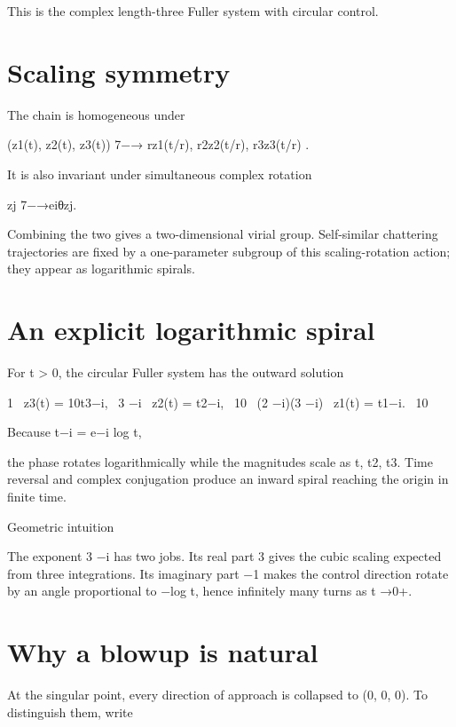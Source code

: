 This is the complex length-three Fuller system with circular control.


\section{Scaling symmetry}

The chain is homogeneous under


(z1(t), z2(t), z3(t)) 7−→ rz1(t/r), r2z2(t/r), r3z3(t/r) .


It is also invariant under simultaneous complex rotation


zj 7−→eiθzj.


Combining the two gives a two-dimensional virial group. Self-similar chattering trajectories are fixed by a one-parameter subgroup of this scaling-rotation action; they appear as logarithmic spirals.


\section{An explicit logarithmic spiral}

For t > 0, the circular Fuller system has the outward solution


\begin{displaytext}
1 \
z3(t) = 10t3−i, \
3 −i \
z2(t) = t2−i, \
10 \
(2 −i)(3 −i) \
z1(t) = t1−i. \
10
\end{displaytext}

Because t−i = e−i log t,


the phase rotates logarithmically while the magnitudes scale as t, t2, t3. Time reversal and complex conjugation produce an inward spiral reaching the origin in finite time.


\begin{insightbox}{Geometric intuition}
\end{insightbox}

The exponent 3 −i has two jobs. Its real part 3 gives the cubic scaling expected from three integrations. Its imaginary part −1 makes the control direction rotate by an angle proportional to −log t, hence infinitely many turns as t →0+.


\section{Why a blowup is natural}

At the singular point, every direction of approach is collapsed to (0, 0, 0). To distinguish them, write


